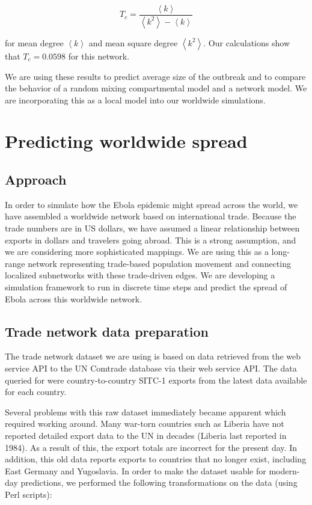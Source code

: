 \documentclass[10pt, journal,onecolumn]{IEEEtran}
\begin{document}
\[
T_c =\dfrac{\left\langle k \right\rangle}{\left\langle k^2 \right\rangle - \left\langle k \right\rangle}
\]

for mean degree $\left\langle k \right\rangle$ and mean square degree
$\left\langle k^2 \right\rangle$. Our calculations show that $T_c=0.0598$ for this network.

We are using these results to predict average size of the outbreak and to compare the behavior of
a random mixing compartmental model and a network model.
We are incorporating this as a local model into our worldwide simulations.






\section{Predicting worldwide spread}
\label{sec:Worldwide}

\subsection*{\textbf{Approach}}
In order to simulate how the Ebola epidemic might spread across the world, we have assembled a
worldwide network based on international trade. Because the trade numbers are in US dollars,
we have assumed a linear relationship between exports in dollars and travelers going abroad.
This is a strong assumption, and we are considering more sophisticated mappings.
We are using this as a long-range network representing trade-based population movement and
connecting localized subnetworks with these trade-driven edges. We are developing a simulation
framework to run in discrete time steps and predict the spread of Ebola across this worldwide network.

\subsection*{\textbf{Trade network data preparation}}

The trade network dataset we are using is based on data retrieved from the web service API to the
UN Comtrade database \citep{uncomtradedata} via their web service API.
The data queried for were country-to-country SITC-1 exports from the latest data available
for each country.

Several problems with this raw dataset immediately became apparent which required working around.
Many war-torn countries such as Liberia have not reported detailed export data
to the UN in decades (Liberia last reported in 1984). As a result of this, the export totals
are incorrect for the present day. In addition, this old data reports exports to countries that
no longer exist, including East Germany and Yugoslavia. In order to make the dataset usable for
modern-day predictions, we performed the following transformations on the data (using Perl scripts):
\end{document}

